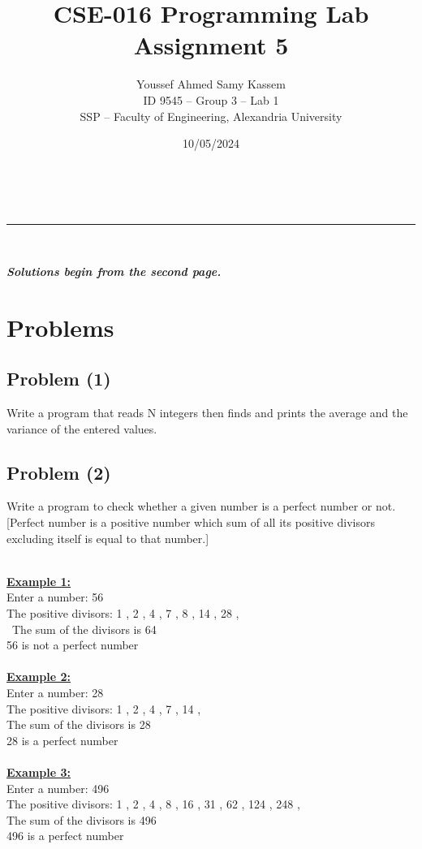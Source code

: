 \documentclass[a4paper,11pt]{article}
\makeatletter
\newcommand{\linia}{\rule{\linewidth}{0.5pt}}
\theoremstyle{mytheor}
\theoremstyle{mytheor}
\renewcommand{\maketitle}{
\begin{center}
\vspace{2ex}
{\huge \textsf{\textbf{\@title}}}
\vspace{1ex}
\\
\linia\\
\textsf{\@date \hfill
\@author}
\vspace{4ex}
\end{center}
}
\makeatother
\begin{document}
\title{CSE-016 Programming Lab Assignment \textnumero{} 5}

\date{10/05/2024}

\author{Youssef Ahmed Samy Kassem\\ \hfill ID 9545 -- Group 3 -- Lab 1\\ \hfill SSP -- Faculty of Engineering, Alexandria University\\}

\maketitle
\textsf{\textsl{\textbf{Solutions begin from the second page.}}}
\section{Problems}
\subsection{Problem (1)}
Write a program that reads N integers then finds and prints the average and the variance of the entered values.
\subsection{Problem (2)}
Write a program to check whether a given number is a perfect number or not.
[Perfect number is a positive number which sum of all its positive divisors excluding itself is equal to that number.]
\begin{multicols}{3}
\ \\\textbf{\underline{Example 1:}}\\
Enter a number: 56\\
The positive divisors: 1 , 2 , 4 , 7 , 8 , 14 , 28 ,\\\
The sum of the divisors is 64\\
56 is not a perfect number\\\\
\textbf{\underline{Example 2:}}\\
Enter a number: 28\\
The positive divisors: 1 , 2 , 4 , 7 , 14 ,\\
The sum of the divisors is 28\\
28 is a perfect number\\\\
\textbf{\underline{Example 3:}}\\
Enter a number: 496\\
The positive divisors: 1 , 2 , 4 , 8 , 16 , 31 , 62 , 124 , 248 ,\\
The sum of the divisors is 496\\
496 is a perfect number
\end{multicols}
\end{document}
